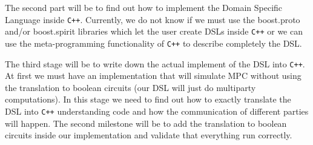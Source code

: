 \documentclass[paper=a4, fontsize=11pt]{scrartcl} %
\numberwithin{equation}{section} %
\numberwithin{figure}{section} %
\numberwithin{table}{section} %
\begin{document}
The second part will be to find out how to implement the Domain Specific Language inside {\tt C++}. Currently, we do not know if we must use the boost.proto and/or boost.spirit libraries which let the user create DSLs inside {\tt C++} or we can use the meta-programming functionality of {\tt C++} to describe completely the DSL. 

The third stage will be to write down the actual implement of the DSL into {\tt C++}. At first we must have an implementation that will simulate MPC without using the translation to boolean circuits (our DSL will just do multiparty computations). In this stage we need to find out how to exactly translate the DSL into {\tt C++} understanding code and how the communication of different parties will happen. The second milestone will be to add the translation to boolean circuits inside our implementation and validate that everything run correctly.
\vspace*{-1.5cm}
\end{document}
